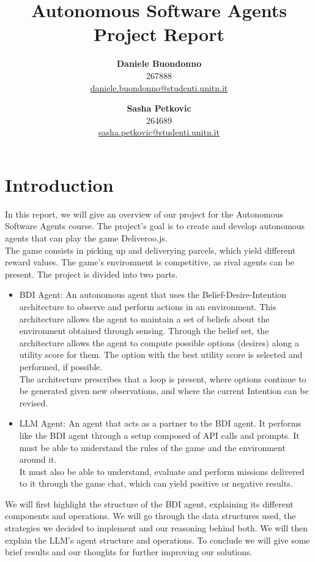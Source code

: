 \documentclass[11pt,a4paper]{article}
\title{\textbf{Autonomous Software Agents Project Report}}
\author{
    \begin{tabular}{c}
        \textbf{Daniele Buondonno} \\
        {267888} \\
        \href{mailto:daniele.buondonno@studenti.unitn.it}{daniele.buondonno@studenti.unitn.it}
    \end{tabular}
    \and
    \begin{tabular}{c}
        \textbf{Sasha Petkovic} \\
        {264689} \\
        \href{mailto:sasha.petkovic@studenti.unitn.it}{sasha.petkovic@studenti.unitn.it}
    \end{tabular}
}
\date{\vspace{-5ex}} %
\begin{document}
\maketitle
\thispagestyle{fancy} %


\section{Introduction}
In this report, we will give an overview of our project for the Autonomous Software Agents course.
The project's goal is to create and develop autonomous agents that can play the game Deliveroo.js.\\
The game consists in picking up and deliverying parcels, which yield different reward values. The game's environment is competitive, as rival agents can be present.
The project is divided into two parts.
\begin{itemize}
    \item BDI Agent: An autonomous agent that uses the Belief-Desire-Intention architecture to observe and perform actions in an environment.
    This architecture allows the agent to maintain a set of beliefs about the environment obtained through sensing. 
    Through the belief set, the architecture allows the agent to compute possible options (desires) along a utility score for them. The option with the best utility score is selected and performed, if possible.\\
    The architecture prescribes that a loop is present, where options continue to be generated given new observations, and where the current Intention can be revised.

    \item LLM Agent: An agent that acts as a partner to the BDI agent. It performs like the BDI agent through a setup composed of API calls and prompts. It must be able to understand the rules of the game and the environment around it.\\
    It must also be able to understand, evaluate and perform missions delivered to it through the game chat, which can yield positive or negative results.
\end{itemize}
We will first highlight the structure of the BDI agent, explaining its different components and operations.
We will go through the data structures used, the strategies we decided to implement and our reasoning behind both. 
We will then explain the LLM's agent structure and operations. To conclude we will give some brief results and our thoughts for further improving our solutions.
\end{document}
